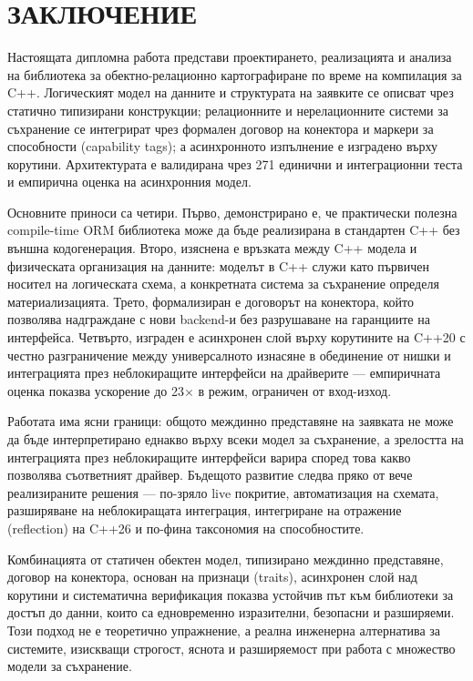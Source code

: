 \section*{ЗАКЛЮЧЕНИЕ}
\label{sec:conclusion}

Настоящата дипломна работа представи проектирането, реализацията и анализа на библиотека за обектно-релационно картографиране по време на компилация за C++. Логическият модел на данните и структурата на заявките се описват чрез статично типизирани конструкции; релационните и нерелационните системи за съхранение се интегрират чрез формален договор на конектора и маркери за способности (capability tags); а асинхронното изпълнение е изградено върху корутини. Архитектурата е валидирана чрез 271 единични и интеграционни теста и емпирична оценка на асинхронния модел.

Основните приноси са четири. Първо, демонстрирано е, че практически полезна compile-time ORM библиотека може да бъде реализирана в стандартен C++ без външна кодогенерация. Второ, изяснена е връзката между C++ модела и физическата организация на данните: моделът в C++ служи като първичен носител на логическата схема, а конкретната система за съхранение определя материализацията. Трето, формализиран е договорът на конектора, който позволява надграждане с нови backend-и без разрушаване на гаранциите на интерфейса. Четвърто, изграден е асинхронен слой върху корутините на C++20 с честно разграничение между универсалното изнасяне в обединение от нишки и интеграцията през неблокиращите интерфейси на драйверите --- емпиричната оценка показва ускорение до 23$\times$ в режим, ограничен от вход-изход.

Работата има ясни граници: общото междинно представяне на заявката не може да бъде интерпретирано еднакво върху всеки модел за съхранение, а зрелостта на интеграцията през неблокиращите интерфейси варира според това какво позволява съответният драйвер. Бъдещото развитие следва пряко от вече реализираните решения --- по-зряло live покритие, автоматизация на схемата, разширяване на неблокиращата интеграция, интегриране на отражение (reflection) на C++26 и по-фина таксономия на способностите.

Комбинацията от статичен обектен модел, типизирано междинно представяне, договор на конектора, основан на признаци (traits), асинхронен слой над корутини и систематична верификация показва устойчив път към библиотеки за достъп до данни, които са едновременно изразителни, безопасни и разширяеми. Този подход не е теоретично упражнение, а реална инженерна алтернатива за системите, изискващи строгост, яснота и разширяемост при работа с множество модели за съхранение.

